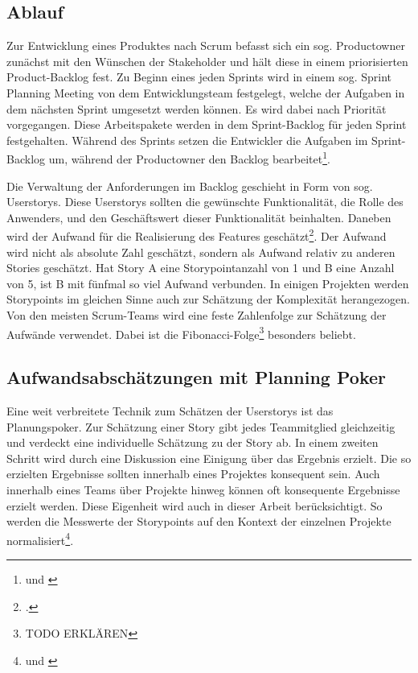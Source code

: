 \subsection{Ablauf}\label{Ablauf}

Zur Entwicklung eines Produktes nach Scrum befasst sich ein sog.
Productowner zunächst mit den Wünschen der Stakeholder und hält diese in
einem priorisierten Product-Backlog fest. Zu Beginn eines jeden Sprints
wird in einem sog. Sprint Planning Meeting von dem Entwicklungsteam
festgelegt, welche der Aufgaben in dem nächsten Sprint umgesetzt werden
können. Es wird dabei nach Priorität vorgegangen. Diese Arbeitspakete
werden in dem Sprint-Backlog für jeden Sprint festgehalten. Während des
Sprints setzen die Entwickler die Aufgaben im Sprint-Backlog um, während
der Productowner den Backlog bearbeitet\footnote{\cite[Vgl. ][]{schwaberAgileSoftwareDevelopment2002} und \cite[][]{schwaberAgileProjectManagement2004}}.

Die Verwaltung der Anforderungen im Backlog geschieht in Form von sog.
Userstorys. Diese Userstorys sollten die gewünschte Funktionalität, die
Rolle des Anwenders, und den Geschäftswert dieser Funktionalität
beinhalten. Daneben wird der Aufwand für die Realisierung des Features
geschätzt\footcite[Vgl. ][]{cohnUserStoriesApplied2004}. Der Aufwand wird nicht
als absolute Zahl geschätzt, sondern als Aufwand relativ zu anderen
Stories geschätzt. Hat Story A eine Storypointanzahl von 1 und B eine
Anzahl von 5, ist B mit fünfmal so viel Aufwand verbunden. In einigen
Projekten werden Storypoints im gleichen Sinne auch zur Schätzung der
Komplexität herangezogen. Von den meisten
Scrum-Teams wird eine feste Zahlenfolge zur Schätzung der Aufwände
verwendet. Dabei ist die Fibonacci-Folge\footnote{TODO ERKLÄREN} besonders
beliebt.

\subsection{Aufwandsabschätzungen mit Planning Poker}\label{Aufwandsabschatzungen-mit-Planning-Poker}

Eine weit verbreitete Technik zum Schätzen der Userstorys ist das
Planungspoker. Zur Schätzung einer Story gibt jedes Teammitglied
gleichzeitig und verdeckt eine individuelle Schätzung zu der Story ab.
In einem zweiten Schritt wird durch eine Diskussion eine Einigung über
das Ergebnis erzielt. Die so erzielten Ergebnisse sollten innerhalb
eines Projektes konsequent sein. Auch innerhalb eines Teams über
Projekte hinweg können oft konsequente Ergebnisse erzielt werden. Diese
Eigenheit wird auch in dieser Arbeit berücksichtigt. So werden die
Messwerte der Storypoints auf den Kontext der einzelnen Projekte
normalisiert\footnote{\cite[Vgl. ][]{cohnAgileEstimatingPlanning2006} und \cite[S. 203]{daltonGreatBigAgile2019a}}.
